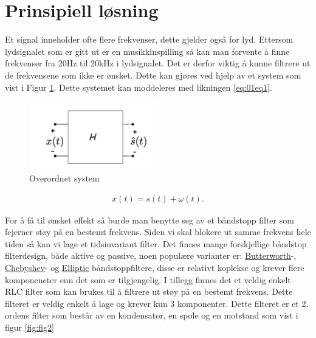 \newpage
\section{Prinsipiell løsning}
\label{prinsipiellLoesning}


Et signal inneholder ofte flere frekvenser, dette gjelder også for lyd. Ettersom lydsignalet som er gitt ut er en musikkinspilling så kan man forvente å finne frekvenser fra 20Hz til 20kHz \cite{Frq_in_audio} i lydsignalet. Det er derfor viktig å kunne filtrere ut de frekvensene som ikke er ønsket. Dette kan gjøres ved hjelp av et system som vist i Figur \ref{fig:fig1}. Dette systemet kan moddeleres med likningen \ref{eq:01eq1}. \cite{Tek_notat}

\begin{figure}[!h]
	\centering
	\includegraphics[width=0.5\textwidth]{Bilder/Overordnetsystem.png}
	\caption{Overordnet system}
	\label{fig:fig1}
\end{figure}

\begin{equation}
	\label{eq:01eq1}
	\begin{split}
		x(t) = s(t) + \omega(t).
	\end{split}
\end{equation}

For å få til ønsket effekt så burde man benytte seg av et båndstopp filter som fejerner støy på en bestemt frekvens. Siden vi skal blokere ut samme frekvens hele tiden så kan vi lage et tidsinvariant filter. Det finnes mange forskjellige båndstop filterdesign, både aktive og passive, noen populære varianter er: \href{https://www.falstad.com/afilter/circuitjs.html?cct=$+1+0.000005+5+50+5+50%0A%25+0+4540.3852025771785%0Ar+928+256+928+432+0+50%0A170+784+256+752+256+2+20+4000+5+0.1%0AO+928+256+992+256+0%0Aw+784+208+784+256+0%0Aw+864+208+864+256+0%0Ag+864+432+864+448+0%0Ag+928+432+928+448+0%0Ac+784+256+864+256+0+0.000004593296450259804+0%0Ac+864+352+864+432+0+1.7108344904994753e-7+0%0Al+784+208+864+208+0+0.0008554172452497378+0%0Al+864+256+864+352+0+0.022966482251299023+0%0AB+784+128+864+528+3+Box%0Aw+864+256+928+256+0%0A}{Butterworth}-, \href{https://en.wikipedia.org/wiki/Chebyshev_filter}{Chebyshev}- og \href{https://www.sciencedirect.com/topics/engineering/elliptic-filters}{Elliptic} båndstoppfiltere, disse er relativt koplekse og krever flere komponeneter enn det som er tilgjengelig. I tillegg finnes det et veldig enkelt RLC filter som kan brukes til å filtrere ut støy på en bestemt frekvens. Dette filteret er veldig enkelt å lage og krever kun 3 komponenter. Dette filteret er et 2. ordens filter som består av en kondensator, en spole og en motstand som vist i figur \ref{fig:fig2}

